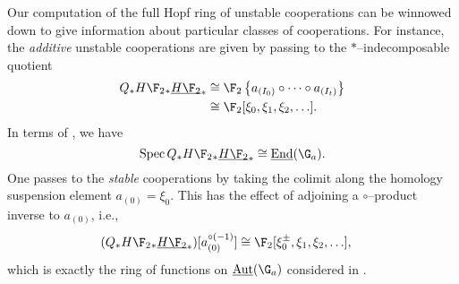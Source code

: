\begin{remark}\label{UnstableCoopnsForHF2AndGa}
Our computation of the full Hopf ring of unstable cooperations can be winnowed down to give information about particular classes of cooperations.  For instance, the \emph{additive} unstable cooperations are given by passing to the $\ast$--indecomposable quotient
\begin{align*}
Q_{\ast} H\F_2{}_* \OS{H\F_2}{*} & \cong \F_2\left\{a_{(I_0)} \circ \cdots \circ a_{(I_t)}\right\} \\
& \cong \F_2[\xi_0, \xi_1, \xi_2, \ldots].
\end{align*} 
In terms of , we have \[\Spec Q_{\ast} H\F_2{}_* \OS{H\F_2}{*} \cong \InternalEnd(\G_a).\]  One passes to the \emph{stable} cooperations by taking the colimit along the homology suspension element $a_{(0)} = \xi_0$.  This has the effect of adjoining a $\circ$--product inverse to $a_{(0)}$, i.e.,
\begin{align*}
(Q_{\ast} H\F_2{}_* \OS{H\F_2}{*})[a_{(0)}^{\circ(-1)}] & \cong \F_2[\xi_0^\pm, \xi_1, \xi_2, \ldots],
\end{align*}
which is exactly the ring of functions on $\InternalAut(\G_a)$ considered in .
\end{remark}


